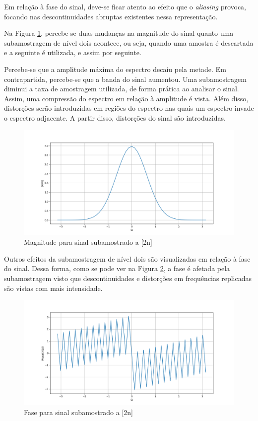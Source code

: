 Em relação à fase do sinal, deve-se ficar atento ao efeito que o \textit{aliasing} provoca, focando nas descontinuidades abruptas existentes nessa representação.

Na Figura \ref{fig:graph_11}, percebe-se duas mudanças na magnitude do sinal quanto uma subamostragem de nível dois acontece, ou seja, quando uma amostra é descartada e a seguinte é utilizada, e assim por seguinte.

Percebe-se que a amplitude máxima do espectro decaiu pela metade. Em contrapartida, percebe-se que a banda do sinal aumentou. Uma subamostragem diminui a taxa de amostragem utilizada, de forma prática ao analisar o sinal. Assim, uma compressão do espectro em relação à amplitude é vista. Além disso, distorções serão introduzidas em regiões do espectro nas quais um espectro invade o espectro adjacente. A partir disso, distorções do sinal são introduzidas.

\begin{figure}[!htb]
    \centering
    \includegraphics[width=\linewidth]{Imagens/fig11.png}
    \caption{Magnitude para sinal subamostrado a [2n]}
    \label{fig:graph_11}
\end{figure}

Outros efeitos da subamostragem de nível dois são visualizadas em relação à fase do sinal. Dessa forma, como se pode ver na Figura \ref{fig:graph_12}, a fase é afetada pela subamostragem visto que descontinuidades e distorções em frequências replicadas são vistas com mais intensidade. 

\begin{figure}[!htb]
    \centering
    \includegraphics[width=\linewidth]{Imagens/fig12.png}
    \caption{Fase para sinal subamostrado a [2n]}
    \label{fig:graph_12}
\end{figure}

